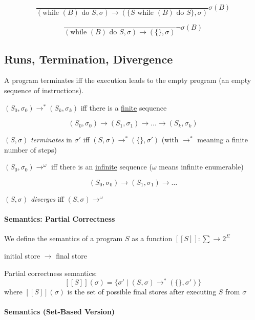 \documentclass[12pt, a4paper]{book}
\begin{document}
$$
\frac{}
{(\textrm{while } (B) \textrm{ do } S, \sigma) \longrightarrow (\{ S \textrm{ while } (B) \textrm{ do } S\}, \sigma)}
\sigma(B)
$$

$$
\frac{}
{(\textrm{while } (B) \textrm{ do } S, \sigma) \longrightarrow (\{ \}, \sigma)}
\lnot\sigma(B)
$$

\subsection{Runs, Termination, Divergence}

A program terminates iff the execution leads to the empty program (an empty
sequence of instructions). \newline

$(S_{0}, \sigma_{0}) \longrightarrow^{*} (S_{k}, \sigma_{k})$ iff there is a
\underline{finite} sequence

$$
(S_{0}, \sigma_{0}) \longrightarrow (S_{1}, \sigma_{1}) \longrightarrow \ldots
\longrightarrow (S_{k}, \sigma_{k})
$$

$(S, \sigma)$ \textit{terminates} in
$\sigma'$ iff $(S, \sigma) \longrightarrow^{*} (\{\}, \sigma')$ (with
$\longrightarrow^{*}$ meaning a finite number of steps)

$(S_{0}, \sigma_{0}) \longrightarrow^{\omega}$ iff there is an
\underline{infinite} sequence ($\omega$ means infinite enumerable)

$$
(S_{0}, \sigma_{0}) \longrightarrow (S_{1}, \sigma_{1}) \longrightarrow \ldots
$$

$(S,\sigma)$ \textit{diverges} iff $(S,\sigma) \longrightarrow^{\omega}$

\paragraph{Semantics: Partial Correctness}

We define the semantics of a program $S$ as a function $[[S]]: \sum \rightarrow 2^{\Sigma}$ \newline

initial store $\rightarrow$ final store \newline

Partial correctness semantics:
$$
[[S]](\sigma) = \{\sigma' \mid (S,\sigma) \longrightarrow^{*} (\{\}, \sigma')\}
$$
where $[[S]](\sigma)$ is the set of possible final stores after executing $S$
from $\sigma$

\paragraph{Semantics (Set-Based Version)}
\end{document}
